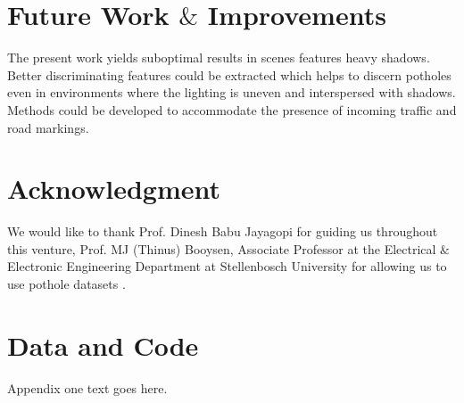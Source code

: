 \documentclass[journal]{IEEEtran}
\begin{document}
\section{Future Work $\&$ Improvements}
The present work yields sub\-optimal results in scenes features heavy shadows. Better discriminating features could be extracted which helps to discern potholes even in environments where the lighting is uneven and interspersed with shadows. Methods could be developed to accommodate the presence of incoming traffic and road markings.


\section*{Acknowledgment}
We would like to thank Prof. Dinesh Babu Jayagopi for guiding us throughout this venture, Prof. MJ (Thinus) Booysen, Associate Professor at the Electrical $\&$ Electronic Engineering Department at Stellenbosch University for allowing us to use pothole datasets \cite{dataset}.

\vspace{0.5cm}

\ifCLASSOPTIONcaptionsoff
  \newpage
\fi


\appendices
\section{Data and Code}
Appendix one text goes here.

\end{document}
